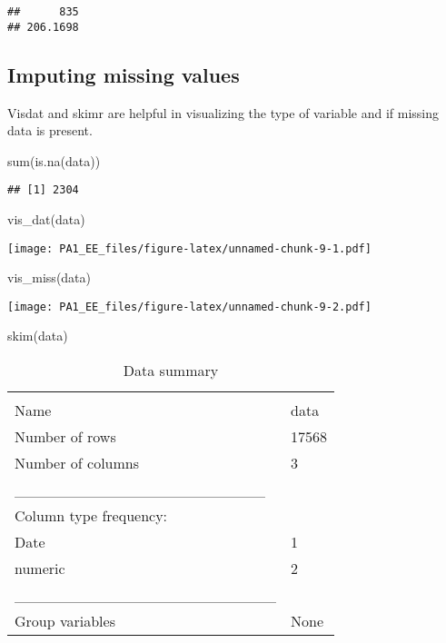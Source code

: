 \documentclass[
]{article}
\newenvironment{Shaded}{\begin{snugshade}}{\end{snugshade}}
\newcommand{\FunctionTok}[1]{\textcolor[rgb]{0.00,0.00,0.00}{#1}}
\newcommand{\NormalTok}[1]{#1}
\begin{document}
\begin{verbatim}
##      835 
## 206.1698
\end{verbatim}

\hypertarget{imputing-missing-values}{%
\subsection{Imputing missing values}\label{imputing-missing-values}}

Visdat and skimr are helpful in visualizing the type of variable and if
missing data is present.

\begin{Shaded}
\begin{Highlighting}[]
\FunctionTok{sum}\NormalTok{(}\FunctionTok{is.na}\NormalTok{(data))}
\end{Highlighting}
\end{Shaded}

\begin{verbatim}
## [1] 2304
\end{verbatim}

\begin{Shaded}
\begin{Highlighting}[]
\FunctionTok{vis\_dat}\NormalTok{(data)}
\end{Highlighting}
\end{Shaded}

\texttt{[image: PA1\_EE\_files/figure-latex/unnamed-chunk-9-1.pdf]}

\begin{Shaded}
\begin{Highlighting}[]
\FunctionTok{vis\_miss}\NormalTok{(data)}
\end{Highlighting}
\end{Shaded}

\texttt{[image: PA1\_EE\_files/figure-latex/unnamed-chunk-9-2.pdf]}

\begin{Shaded}
\begin{Highlighting}[]
\FunctionTok{skim}\NormalTok{(data)}
\end{Highlighting}
\end{Shaded}

\begin{longtable}[]{@{}ll@{}}
\caption{Data summary}\tabularnewline
\toprule
& \\
\midrule
\endfirsthead
\toprule
& \\
\midrule
\endhead
Name & data \\
Number of rows & 17568 \\
Number of columns & 3 \\
\_\_\_\_\_\_\_\_\_\_\_\_\_\_\_\_\_\_\_\_\_\_\_ & \\
Column type frequency: & \\
Date & 1 \\
numeric & 2 \\
\_\_\_\_\_\_\_\_\_\_\_\_\_\_\_\_\_\_\_\_\_\_\_\_ & \\
Group variables & None \\
\bottomrule
\end{longtable}
\end{document}
